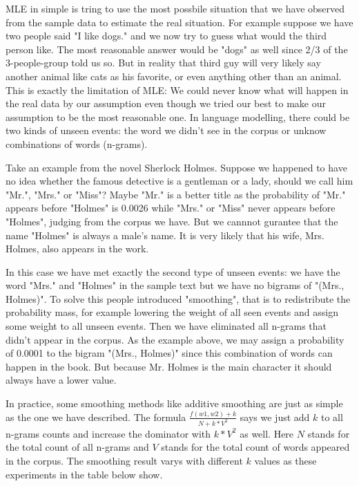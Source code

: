 \documentclass[11pt]{article} %
\begin{document}
MLE in simple is tring to use the most possbile situation that we have observed from the sample data to estimate the real situation. For example suppose we have two people said "I like dogs." and we now try to guess what would the third person like. The most reasonable answer would be "dogs" as well since 2/3 of the 3-people-group told us so. But in reality that third guy will very likely say another animal like cats as his favorite, or even anything other than an animal. This is exactly the limitation of MLE: We could never know what will happen in the real data by our assumption even though we tried our best to make our assumption to be the most reasonable one. In language modelling, there could be two kinds of unseen events: the word we didn't see in the corpus or unknow combinations of words (n-grams).

Take an example from the novel Sherlock Holmes. Suppose we happened to have no idea whether the famous detective is a gentleman or a lady, should we call him "Mr.", "Mrs." or "Miss"? Maybe "Mr." is a better title as the probability of "Mr." appears before "Holmes" is 0.0026 while "Mrs." or "Miss" never appears before "Holmes", judging from the corpus we have. But we cannnot gurantee that the name "Holmes" is always a male's name. It is very likely that his wife, Mrs. Holmes, also appears in the work. 

In this case we have met exactly the second type of unseen events: we have the word "Mrs." and "Holmes" in the sample text but we have no bigrams of "(Mrs., Holmes)". To solve this people introduced "smoothing", that is to redistribute the probability mass, for example lowering the weight of all seen events and assign some weight to all unseen events. Then we have eliminated all n-grams that didn't appear in the corpus. As the example above, we may assign a probability of 0.0001 to the bigram "(Mrs., Holmes)" since this combination of words can happen in the book. But because Mr. Holmes is the main character it should always have a lower value.

In practice, some smoothing methods like additive smoothing are just as simple as the one we have described. The formula $\frac{f(w1, w2)+k}{N+k*V^2}$ says we just add $k$ to all n-grams counts and increase the dominator with $k*V^2$ as well. Here $N$ stands for the total count of all n-grams and $V$ stands for the total count of words appeared in the corpus. The smoothing result varys with different $k$ values as these experiments in the table below show.
\end{document}
